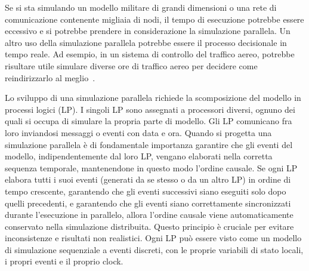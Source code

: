 \documentclass[12pt,a4paper,openright,twoside]{book}
\begin{document}
Se si sta simulando un modello militare di grandi dimensioni o una rete di comunicazione contenente migliaia di nodi, il tempo di esecuzione potrebbe essere eccessivo e si potrebbe prendere in considerazione la simulazione parallela. Un altro uso della simulazione parallela potrebbe essere il processo decisionale in tempo reale. Ad esempio, in un sistema di controllo del traffico aereo, potrebbe risultare utile simulare diverse ore di traffico aereo per decidere come reindirizzarlo al meglio~\cite{DBLP:conf/wsc/Wieland98}. 

Lo sviluppo di una simulazione parallela richiede la scomposizione del modello in processi logici (LP). I singoli LP sono assegnati a processori diversi, ognuno dei quali si occupa di simulare la propria parte di modello. Gli LP comunicano fra loro inviandosi messaggi o eventi con data e ora.
Quando si progetta una simulazione parallela è di fondamentale importanza garantire che gli eventi del modello, indipendentemente dal loro LP, vengano elaborati nella corretta sequenza temporale, mantenendone in questo modo l'ordine causale. Se ogni LP elabora tutti i suoi eventi (generati da se stesso o da un altro LP) in ordine di tempo crescente, garantendo che gli eventi successivi siano eseguiti solo dopo quelli precedenti, e garantendo che gli eventi siano correttamente sincronizzati durante l'esecuzione in parallelo, allora l'ordine causale viene automaticamente conservato nella simulazione distribuita. Questo principio è cruciale per evitare inconsistenze e risultati non realistici.
Ogni LP può essere visto come un modello di simulazione sequenziale a eventi discreti, con le proprie variabili di stato locali, i propri eventi e il proprio clock.
\end{document}
